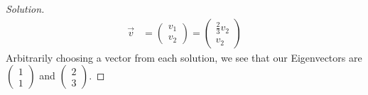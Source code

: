 \documentclass[ 12pt ]{article}
\begin{document}
\begin{enumerate}
\begin{proof}[Solution]
\begin{align*}
				\vec{v} &= \begin{pmatrix} v_1 \\ v_2 \end{pmatrix} = \begin{pmatrix} \frac{2}{3}v_2 \\ v_2 \end{pmatrix}
			\end{align*}
			Arbitrarily choosing a vector from each solution, we see that our Eigenvectors are $\begin{pmatrix} 1 \\ 1 \end{pmatrix}$ and $\begin{pmatrix} 2 \\ 3 \end{pmatrix}$.
		\end{proof}

\end{enumerate}
\end{document}
